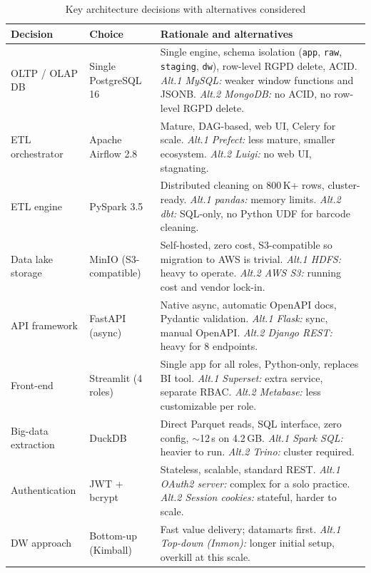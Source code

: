 \documentclass[a4paper,11pt,oneside,openany]{report}
\begin{document}
\begin{table}[H]
\centering
\caption{Key architecture decisions with alternatives considered}
\label{tab:arch-decisions}
\begin{tabularx}{\textwidth}{L{3cm} L{2.5cm} L{7.5cm}}
\toprule
\textbf{Decision} & \textbf{Choice} & \textbf{Rationale and alternatives} \\
\midrule
OLTP / OLAP DB & Single PostgreSQL 16 & Single engine, schema isolation (\texttt{app}, \texttt{raw}, \texttt{staging}, \texttt{dw}), row-level RGPD delete, ACID. \textit{Alt.1 MySQL:} weaker window functions and JSONB. \textit{Alt.2 MongoDB:} no ACID, no row-level RGPD delete. \\
ETL orchestrator & Apache Airflow 2.8 & Mature, DAG-based, web UI, Celery for scale. \textit{Alt.1 Prefect:} less mature, smaller ecosystem. \textit{Alt.2 Luigi:} no web UI, stagnating. \\
ETL engine & PySpark 3.5 & Distributed cleaning on 800\,K+ rows, cluster-ready. \textit{Alt.1 pandas:} memory limits. \textit{Alt.2 dbt:} SQL-only, no Python UDF for barcode cleaning. \\
Data lake storage & MinIO (S3-compatible) & Self-hosted, zero cost, S3-compatible so migration to AWS is trivial. \textit{Alt.1 HDFS:} heavy to operate. \textit{Alt.2 AWS S3:} running cost and vendor lock-in. \\
API framework & FastAPI (async) & Native async, automatic OpenAPI docs, Pydantic validation. \textit{Alt.1 Flask:} sync, manual OpenAPI. \textit{Alt.2 Django REST:} heavy for 8 endpoints. \\
Front-end & Streamlit (4 roles) & Single app for all roles, Python-only, replaces BI tool. \textit{Alt.1 Superset:} extra service, separate RBAC. \textit{Alt.2 Metabase:} less customizable per role. \\
Big-data extraction & DuckDB & Direct Parquet reads, SQL interface, zero config, $\sim$12\,s on 4.2\,GB. \textit{Alt.1 Spark SQL:} heavier to run. \textit{Alt.2 Trino:} cluster required. \\
Authentication & JWT + bcrypt & Stateless, scalable, standard REST. \textit{Alt.1 OAuth2 server:} complex for a solo practice. \textit{Alt.2 Session cookies:} stateful, harder to scale. \\
DW approach & Bottom-up (Kimball) & Fast value delivery; datamarts first. \textit{Alt.1 Top-down (Inmon):} longer initial setup, overkill at this scale. \\
\bottomrule
\end{tabularx}
\end{table}
\end{document}
